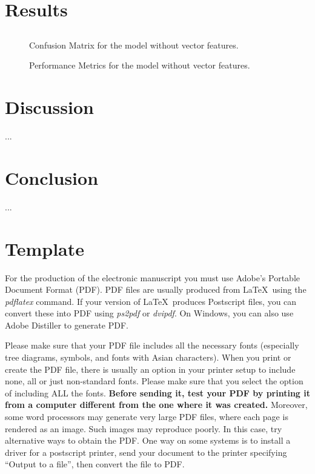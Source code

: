 \documentclass[11pt]{article}
\begin{document}
\section{Results}

\subsection{}

\begin{figure}[h!]
    \centering
    
    \caption{Confusion Matrix for the model without vector features.}
    \label{fig:base_model_no_vectors_cm}
\end{figure}

\begin{figure}[h!]
    \centering
    
    \caption{Performance Metrics for the model without vector features.}
    \label{fig:base_model_no_vectors_error_bar}
\end{figure}


\section{Discussion}

...

\section{Conclusion}

...


\section{Template}
\label{sect:pdf}

For the production of the electronic manuscript you must use Adobe's
Portable Document Format (PDF). PDF files are usually produced from
\LaTeX\ using the \textit{pdflatex} command. If your version of
\LaTeX\ produces Postscript files, you can convert these into PDF
using \textit{ps2pdf} or \textit{dvipdf}. On Windows, you can also use
Adobe Distiller to generate PDF.

Please make sure that your PDF file includes all the necessary fonts
(especially tree diagrams, symbols, and fonts with Asian
characters). When you print or create the PDF file, there is usually
an option in your printer setup to include none, all or just
non-standard fonts.  Please make sure that you select the option of
including ALL the fonts. \textbf{Before sending it, test your PDF by
  printing it from a computer different from the one where it was
  created.} Moreover, some word processors may generate very large PDF
files, where each page is rendered as an image. Such images may
reproduce poorly. In this case, try alternative ways to obtain the
PDF. One way on some systems is to install a driver for a postscript
printer, send your document to the printer specifying ``Output to a
file'', then convert the file to PDF.
\end{document}
